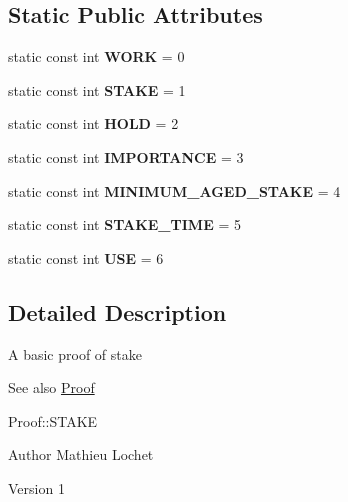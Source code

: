 \subsection*{Static Public Attributes}
\begin{DoxyCompactItemize}
\item 
\mbox{\label{classProof_a457d231986439ee6bcc945daacfc28fc}} 
static const int {\bfseries W\+O\+RK} = 0
\item 
\mbox{\label{classProof_acf157976c3c86ef2fd0e838b8c4ac992}} 
static const int {\bfseries S\+T\+A\+KE} = 1
\item 
\mbox{\label{classProof_ae5c2a86640bf558ff5625157e23b3eec}} 
static const int {\bfseries H\+O\+LD} = 2
\item 
\mbox{\label{classProof_a4e71a5e5928900794353acdd169ca652}} 
static const int {\bfseries I\+M\+P\+O\+R\+T\+A\+N\+CE} = 3
\item 
\mbox{\label{classProof_a1a08ffc465f4fcfde396d4c4feb22eb0}} 
static const int {\bfseries M\+I\+N\+I\+M\+U\+M\+\_\+\+A\+G\+E\+D\+\_\+\+S\+T\+A\+KE} = 4
\item 
\mbox{\label{classProof_a1aa2cb91c5be4ca021714ff6fc01da4a}} 
static const int {\bfseries S\+T\+A\+K\+E\+\_\+\+T\+I\+ME} = 5
\item 
\mbox{\label{classProof_a3f6898fa1d652d32182c3c387c8e979c}} 
static const int {\bfseries U\+SE} = 6
\end{DoxyCompactItemize}


\subsection{Detailed Description}
A basic proof of stake \begin{DoxySeeAlso}{See also}
\mbox{\hyperlink{classProof}{Proof}} 

Proof\+::\+S\+T\+A\+KE
\end{DoxySeeAlso}
\begin{DoxyAuthor}{Author}
Mathieu Lochet 
\end{DoxyAuthor}
\begin{DoxyVersion}{Version}
1 
\end{DoxyVersion}


